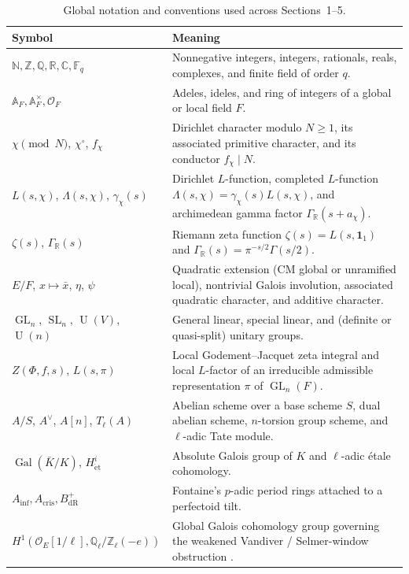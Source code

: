 \documentclass[11pt,reqno]{amsart}
\theoremstyle{plain}
\theoremstyle{definition}
\newcommand{\leanlink}[1]{\allowbreak{\tiny\texttt{[\expandafter\nolinkurl\expandafter{\detokenize{#1}}]}}}
\newcommand{\C}{\mathbb{C}}
\newcommand{\R}{\mathbb{R}}
\newcommand{\Q}{\mathbb{Q}}
\newcommand{\Z}{\mathbb{Z}}
\newcommand{\N}{\mathbb{N}}
\newcommand{\A}{\mathbb{A}}
\newcommand{\F}{\mathbb{F}}
\DeclareMathOperator{\Gal}{Gal}
\DeclareMathOperator{\GL}{GL}
\DeclareMathOperator{\SL}{SL}
\DeclareMathOperator{\U}{U}
\begin{document}
\begin{table}[ht]
\centering
\caption{Global notation and conventions used across Sections~1--5.}
\label{tab:ch01-notation}
{\small
\begin{tabular}{@{}p{}p{}@{}}
\toprule
Symbol & Meaning \\
\midrule
$\N, \Z, \Q, \R, \C, \F_q$ & Nonnegative integers, integers, rationals, reals, complexes, and finite field of order $q$. \\
$\A_F, \A_F^{\times}, \mathcal{O}_F$ & Adeles, ideles, and ring of integers of a global or local field $F$. \\
$\chi \pmod{N}$, $\chi^{\circ}$, $f_{\chi}$ & Dirichlet character modulo $N \ge 1$, its associated primitive character, and its conductor $f_{\chi} \mid N$. \\
$L(s, \chi)$, $\Lambda(s, \chi)$, $\gamma_{\chi}(s)$ & Dirichlet $L$-function, completed $L$-function $\Lambda(s, \chi) = \gamma_{\chi}(s) L(s, \chi)$, and archimedean gamma factor $\Gamma_{\R}(s + a_{\chi})$. \\
$\zeta(s)$, $\Gamma_{\R}(s)$ & Riemann zeta function $\zeta(s) = L(s, \mathbf{1}_1)$ and $\Gamma_{\R}(s) = \pi^{-s/2}\Gamma(s/2)$. \\
$E/F$, $x \mapsto \bar{x}$, $\eta$, $\psi$ & Quadratic extension (CM global or unramified local), nontrivial Galois involution, associated quadratic character, and additive character. \\
$\GL_n$, $\SL_n$, $\U(V)$, $\U(n)$ & General linear, special linear, and (definite or quasi-split) unitary groups. \\
$Z(\Phi, f, s)$, $L(s, \pi)$ & Local Godement--Jacquet zeta integral and local $L$-factor of an irreducible admissible representation $\pi$ of $\GL_n(F)$. \\
$A/S$, $A^{\vee}$, $A[n]$, $T_{\ell}(A)$ & Abelian scheme over a base scheme $S$, dual abelian scheme, $n$-torsion group scheme, and $\ell$-adic Tate module. \\
$\Gal(\bar{K}/K)$, $H^i_{\mathrm{\acute{e}t}}$ & Absolute Galois group of $K$ and $\ell$-adic \'etale cohomology. \\
$A_{\mathrm{inf}}, A_{\mathrm{cris}}, B_{\mathrm{dR}}^+$ & Fontaine's $p$-adic period rings attached to a perfectoid tilt. \\
$H^1(\mathcal{O}_E[1/\ell], \Q_\ell/\Z_\ell(-e))$ & Global Galois cohomology group governing the weakened Vandiver / Selmer-window obstruction \leanlink{UpperTheory.Top.VWin}. \\
\bottomrule
\end{tabular}
}
\end{table}
\end{document}
